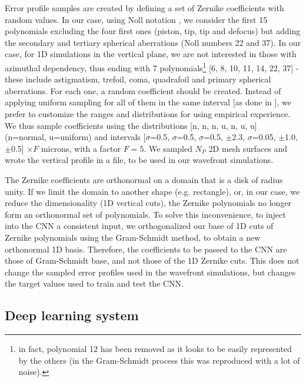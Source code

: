 \documentclass[preprint]{iucr}
\newcommand{\inred}[1]{{\color{red}#1}}
\begin{document}
Error profile samples are \inred{created by} defining a set of Zernike coefficients with random values. In our case, using Noll notation \cite{Noll:76}, we consider the first 15 polynomials excluding the four first ones (piston, tip, tip and defocus) but adding the secondary and \inred{tertiary} spherical aberrations (Noll numbers 22 and 37). In our case, for 1D simulations in the vertical plane, we are not interested in those with azimuthal dependency, thus ending with 7 polynomials\footnote{in fact, polynomial 12 has been removed as it looks to be easily represented by the others (in the Gram-Schmidt process this was reproduced with a lot of noise). } [6, 8, 10, 11, 14, 22, 37] - \inred{these include astigmatism, trefoil, coma, quadrafoil and primary spherical aberrations}. For each one, a random coefficient should be created. Instead of applying uniform sampling for all of them in the same interval [as done in \cite{Saha2020}], we prefer to customize the ranges and distributions for using empirical experience. We thus sample coefficients using the distributions [n, n, n, u, n, u, u]  (n=normal, u=uniform) and intervals [$\sigma$=0.5, $\sigma$=0.5, $\sigma$=0.5, $\pm$2.3, $\sigma$=0.05, $\pm$1.0, $\pm$0.5] $\times F$ microns, with a factor $F=5$. We sampled $N_P$ 2D mesh surfaces and wrote the vertical profile in a file, to be used in our wavefront simulations.

The Zernike coefficients are orthonormal on a domain that is a disk of radius unity. If we limit the domain to another shape (e.g. rectangle), or, in our case, we reduce the dimensionality (1D vertical cuts), the Zernike polynomials no longer form an orthonormal set of polynomials. To solve this inconvenience, to inject into the CNN a consistent input, we orthogonalized our base of 1D cuts of Zernike polynomials using the Gram-Schmidt method, to obtain a new orthonormal 1D basis. Therefore, the coefficients to be passed to the CNN are those of Gram-Schmidt base, and not those of the 1D Zernike cuts. This does not change the sampled error profiles used in the wavefront simulations, but changes the target values used to train and test the CNN.  

\subsection{Deep learning system}
\end{document}
